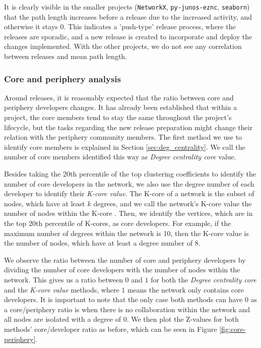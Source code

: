 It is clearly visible in the smaller projects (\texttt{NetworkX}, \texttt{py-junos-eznc}, \texttt{seaborn}) that the path length increases before a release due to the increased activity, and otherwise it stays $0$. This indicates a 'push-type' release process, where the releases are sporadic, and a new release is created to incorporate and deploy the changes implemented. With the other projects, we do not see any correlation between releases and mean path length.

\subsubsection{Core and periphery analysis}

Around releases, it is reasonably expected that the ratio between core and periphery developers changes. It has already been established that within a project, the core members tend to stay the same throughout the project's lifecycle, but the tasks regarding the new release preparation might change their relation with the periphery community members. The first method we use to identify core members is explained in Section \ref{sec:deg_centrality}. We call the number of core members identified this way as \textit{Degree centrality core} value. 

Besides taking the 20th percentile of the top clustering coefficients to identify the number of core developers in the network, we also use the degree number of each developer to identify their \textit{K-core value}. The K-core of a network is the subset of nodes, which have at least $k$ degrees, and we call the network's K-core value the number of nodes within the K-core \cite{batageljAlgorithmCoresDecomposition2003}. Then, we identify the vertices, which are in the top 20th percentile of K-cores, as core developers. For example, if the maximum number of degrees within the network is 10, then the K-core value is the number of nodes, which have at least a degree number of 8.

We observe the ratio between the number of core and periphery developers by dividing the number of core developers with the number of nodes within the network. This gives us a ratio between $0$ and $1$ for both the \textit{Degree centrality core} and the \textit{K-core value} methods, where $1$ means the network only contains core developers. It is important to note that the only case both methods can have $0$ as a core/periphery ratio is when there is no collaboration within the network and all nodes are isolated with a degree of $0$. We then plot the Z-values for both methods' core/developer ratio as before, which can be seen in Figure \ref{fig:core-periphery}.

